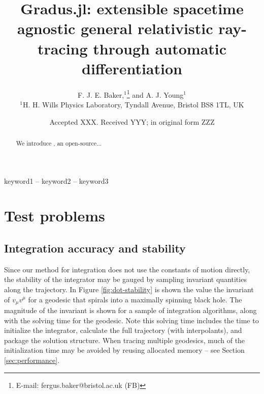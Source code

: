 \documentclass[fleqn,usenatbib]{mnras}
\title[Gradus.jl]{Gradus.jl: extensible spacetime agnostic general relativistic ray-tracing through automatic differentiation}
\author[F. J. E. Baker et al.]{
F. J. E. Baker,$^{1}$\thanks{E-mail: fergus.baker@bristol.ac.uk (FB)}
and A. J. Young$^{1}$
\\
$^{1}$H. H. Wills Physics Laboratory, Tyndall Avenue, Bristol BS8 1TL, UK
}
\date{Accepted XXX. Received YYY; in original form ZZZ}
\begin{document}
\label{firstpage}
\pagerange{\pageref{firstpage}--\pageref{lastpage}}
\maketitle

\begin{abstract}
	We introduce \Gradus, an open-source...
\end{abstract}

\begin{keywords}
keyword1 -- keyword2 -- keyword3
\end{keywords}









\section{Test problems}

\subsection{Integration accuracy and stability}

Since our method for integration does not use the constants of motion directly, the stability of the integrator may be gauged by sampling invariant quantities along the trajectory. In Figure \ref{fig:dot-stability} is shown the value the invariant of $v_\mu v^\mu$ for a geodesic that spirals into a maximally spinning black hole. The magnitude of the invariant is shown for a sample of integration algorithms, along with the solving time for the geodesic. Note this solving time includes the time to initialize the integrator, calculate the full trajectory (with interpolants), and package the solution structure. When tracing multiple geodesics, much of the initialization time may be avoided by reusing allocated memory -- see Section \ref{sec:performance}.
\end{document}

